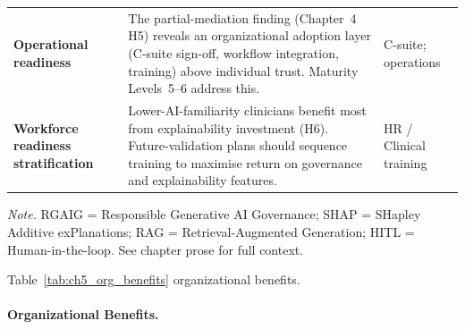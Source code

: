 {\begin{xltabular}{\textwidth}{@{} >{\raggedright\arraybackslash}p{3.0cm} p{8.3cm} >{\raggedright\arraybackslash}p{3.1cm} @{}}
\textbf{Operational readiness} & The partial-mediation finding (Chapter~4 H5) reveals an organizational adoption layer (C-suite sign-off, workflow integration, training) above individual trust. Maturity Levels~5--6 address this. & C-suite; operations \\
\textbf{Workforce readiness stratification} & Lower-AI-familiarity clinicians benefit most from explainability investment (H6). Future-validation plans should sequence training to maximise return on governance and explainability features. & HR / Clinical training \\
\end{xltabular}}
\vspace{0.3em}\noindent\textit{Note.} RGAIG = Responsible Generative AI Governance; SHAP = SHapley Additive exPlanations; RAG = Retrieval-Augmented Generation; HITL = Human-in-the-loop. See chapter prose for full context.

\noindent Table~\ref{tab:ch5_org_benefits} organizational benefits.

\paragraph{Organizational Benefits.}




